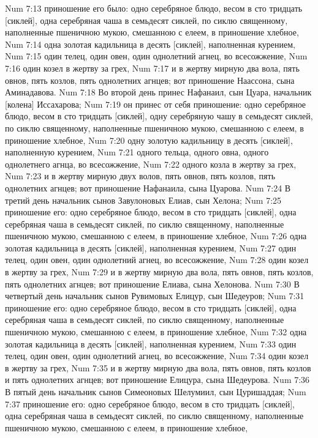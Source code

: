 Num 7:13  приношение его было: одно серебряное блюдо, весом в сто тридцать [сиклей], одна серебряная чаша в семьдесят сиклей, по сиклю священному, наполненные пшеничною мукою, смешанною с елеем, в приношение хлебное,
Num 7:14  одна золотая кадильница в десять [сиклей], наполненная курением,
Num 7:15  один телец, один овен, один однолетний агнец, во всесожжение,
Num 7:16  один козел в жертву за грех,
Num 7:17  и в жертву мирную два вола, пять овнов, пять козлов, пять однолетних агнцев; вот приношение Наассона, сына Аминадавова.
Num 7:18  Во второй день принес Нафанаил, сын Цуара, начальник [колена] Иссахарова;
Num 7:19  он принес от себя приношение: одно серебряное блюдо, весом в сто тридцать [сиклей], одну серебряную чашу в семьдесят сиклей, по сиклю священному, наполненные пшеничною мукою, смешанною с елеем, в приношение хлебное,
Num 7:20  одну золотую кадильницу в десять [сиклей], наполненную курением,
Num 7:21  одного тельца, одного овна, одного однолетнего агнца, во всесожжение,
Num 7:22  одного козла в жертву за грех,
Num 7:23  и в жертву мирную двух волов, пять овнов, пять козлов, пять однолетних агнцев; вот приношение Нафанаила, сына Цуарова.
Num 7:24  В третий день начальник сынов Завулоновых Елиав, сын Хелона;
Num 7:25  приношение его: одно серебряное блюдо, весом в сто тридцать [сиклей], одна серебряная чаша в семьдесят сиклей, по сиклю священному, наполненные пшеничною мукою, смешанною с елеем, в приношение хлебное,
Num 7:26  одна золотая кадильница в десять [сиклей], наполненная курением,
Num 7:27  один телец, один овен, один однолетний агнец, во всесожжение,
Num 7:28  один козел в жертву за грех,
Num 7:29  и в жертву мирную два вола, пять овнов, пять козлов, пять однолетних агнцев; вот приношение Елиава, сына Хелонова.
Num 7:30  В четвертый день начальник сынов Рувимовых Елицур, сын Шедеуров;
Num 7:31  приношение его: одно серебряное блюдо, весом в сто тридцать [сиклей], одна серебряная чаша в семьдесят сиклей, по сиклю священному, наполненные пшеничною мукою, смешанною с елеем, в приношение хлебное,
Num 7:32  одна золотая кадильница в десять [сиклей], наполненная курением,
Num 7:33  один телец, один овен, один однолетний агнец, во всесожжение,
Num 7:34  один козел в жертву за грех,
Num 7:35  и в жертву мирную два вола, пять овнов, пять козлов и пять однолетних агнцев; вот приношение Елицура, сына Шедеурова.
Num 7:36  В пятый день начальник сынов Симеоновых Шелумиил, сын Цуришаддая;
Num 7:37  приношение его: одно серебряное блюдо, весом в сто тридцать [сиклей], одна серебряная чаша в семьдесят сиклей, по сиклю священному, наполненные пшеничною мукою, смешанною с елеем, в приношение хлебное,
